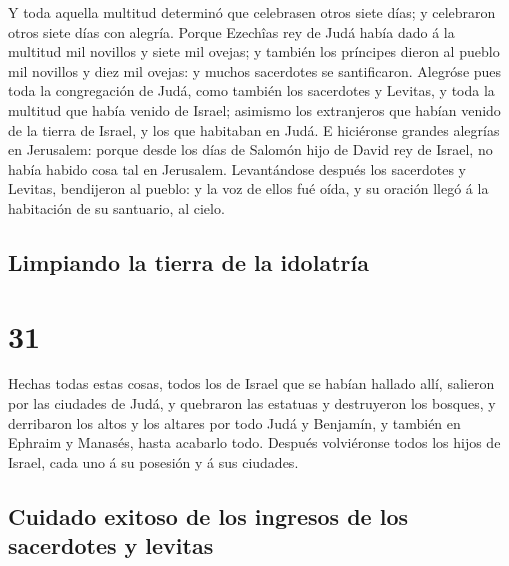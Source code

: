  Y toda aquella multitud determinó que celebrasen otros
siete días; y celebraron otros siete días con alegría. 
Porque Ezechîas rey de Judá había dado á la multitud mil novillos y
siete mil ovejas; y también los príncipes dieron al pueblo mil novillos
y diez mil ovejas: y muchos sacerdotes se santificaron. 
Alegróse pues toda la congregación de Judá, como también los sacerdotes
y Levitas, y toda la multitud que había venido de Israel; asimismo los
extranjeros que habían venido de la tierra de Israel, y los que
habitaban en Judá.  E hiciéronse grandes alegrías en
Jerusalem: porque desde los días de Salomón hijo de David rey de Israel,
no había habido cosa tal en Jerusalem.  Levantándose
después los sacerdotes y Levitas, bendijeron al pueblo: y la voz de
ellos fué oída, y su oración llegó á la habitación de su santuario, al
cielo.

\hypertarget{limpiando-la-tierra-de-la-idolatruxeda}{%
\subsection{Limpiando la tierra de la
idolatría}\label{limpiando-la-tierra-de-la-idolatruxeda}}

\hypertarget{section-30}{%
\section{31}\label{section-30}}

 Hechas todas estas cosas, todos los de Israel que se
habían hallado allí, salieron por las ciudades de Judá, y quebraron las
estatuas y destruyeron los bosques, y derribaron los altos y los altares
por todo Judá y Benjamín, y también en Ephraim y Manasés, hasta acabarlo
todo. Después volviéronse todos los hijos de Israel, cada uno á su
posesión y á sus ciudades.

\hypertarget{cuidado-exitoso-de-los-ingresos-de-los-sacerdotes-y-levitas}{%
\subsection{Cuidado exitoso de los ingresos de los sacerdotes y
levitas}\label{cuidado-exitoso-de-los-ingresos-de-los-sacerdotes-y-levitas}}

